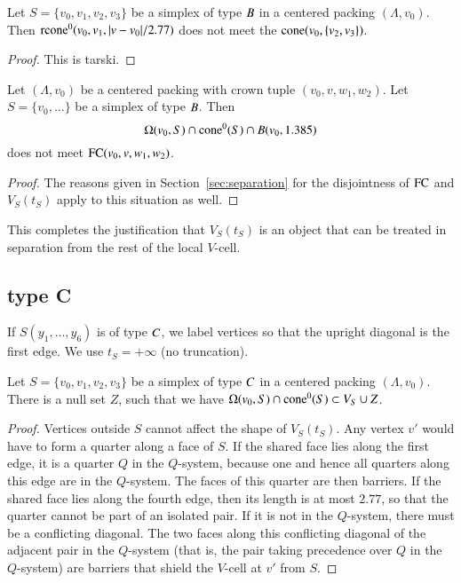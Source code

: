 \begin{lemma}
 Let $S=\{v_0,v_1,v_2,v_3\}$ be a simplex of type $B$ in a centered packing $(\Lambda,v_0)$.
Then  ${\operatorname{rcone}}^0(v_0,v_1,|v-v_0|/2.77)$ does not meet the
${\operatorname{cone}}(v_0,\{v_2,v_3\})$.
\end{lemma}

\begin{proof} This is tarski.
\end{proof}

\begin{lemma} 
Let $(\Lambda,v_0)$ be a centered packing with crown tuple $(v_0,v,w_1,w_2)$.
Let $S=\{v_0,\ldots\}$ be a simplex of type $B$. Then
$$\Omega(v_0,S) \cap {\operatorname{cone}}^0(S) \cap B(v_0,1.385)$$
does not meet ${\operatorname{FC}}(v_0,v,w_1,w_2)$.
\end{lemma}

\begin{proof}
The reasons given in Section~\ref{sec:separation} for the
disjointness of ${\operatorname{FC}}$ and $V_S(t_S)$ apply to this
situation as well.
\end{proof}


This completes the justification that
$V_S(t_S)$ is an object that can be treated in separation from the
rest of the local $V$-cell.

\subsection{type C}%

If $S(y_1,\ldots,y_6)$ is of type $C$, we label vertices so that
the upright diagonal is the first edge.  We use $t_S =+\infty$ (no
truncation).   

\begin{lemma}
Let $S=\{v_0,v_1,v_2,v_3\}$ be a simplex of type $C$ in a centered packing
$(\Lambda,v_0)$.
There is a null set $Z$, such that
we have  $ \Omega(v_0,S) \cap {\operatorname{cone}}^0(S) \subset V_S \cup Z$.
\end{lemma}

\begin{proof}  %
Vertices outside $S$ cannot affect the shape of $V_S(t_S)$.  Any
vertex $v'$ would have to form a quarter along a face of $S$.  If
the shared face lies along the first edge, it is a quarter $Q$ in
the $Q$-system, because one and hence all quarters along this edge
are in the $Q$-system.  The faces of this quarter are then
barriers. If the shared face lies along the fourth edge, then its
length is at most $2.77$, so that the quarter cannot be part of an
isolated pair. If it is not in the $Q$-system, there must be a
conflicting diagonal. The two faces along this conflicting
diagonal of the adjacent pair in the $Q$-system (that is, the pair
taking precedence over $Q$ in the $Q$-system) are barriers that
shield the $V$-cell at $v'$ from $S$.
\end{proof}


